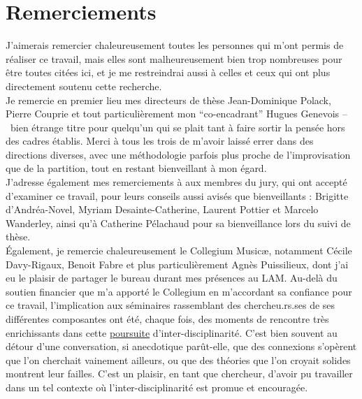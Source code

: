 %
\chapter*{Remerciements}
\label{sec:acknowledgement}
\vspace*{-10mm}


J'aimerais remercier chaleureusement toutes les personnes qui m'ont permis de réaliser ce travail, mais elles sont malheureusement bien trop nombreuses pour être toutes citées ici, et je me restreindrai aussi à celles et ceux qui ont plus directement soutenu cette recherche.\\
\indent Je remercie en premier lieu mes directeurs de thèse Jean-Dominique Polack, Pierre Couprie et tout particulièrement mon ``co-encadrant'' Hugues Genevois --~bien étrange titre pour quelqu'un qui se plait tant à faire sortir la pensée hors des cadres établis. Merci à tous les trois de m'avoir laissé errer dans des directions diverses, avec une méthodologie parfois plus proche de l'improvisation que de la partition, tout en restant bienveillant à mon égard.\\
\noindent J'adresse également mes remerciements à aux membres du jury, qui ont accepté d'examiner ce travail, pour leurs conseils aussi avisés que bienveillants : Brigitte d'Andréa-Novel, Myriam Desainte-Catherine, Laurent Pottier et Marcelo Wanderley, ainsi qu'à Catherine Pélachaud pour sa bienveillance lors du suivi de thèse.\\
\indent Également, je remercie chaleureusement le Collegium Musicæ, notamment Cécile Davy-Rigaux, Benoit Fabre et plus particulièrement Agnès Puissilieux, dont j'ai eu le plaisir de partager le bureau durant mes présences au LAM. Au-delà du soutien financier que m'a apporté le Collegium en m'accordant sa confiance pour ce travail, l'implication aux séminaires rassemblant des chercheu.rs.ses de ses différentes composantes ont été, chaque fois, des moments de rencontre très enrichissants dans cette \ul{poursuite} d'inter-disciplinarité. C'est bien souvent au détour d'une conversation, si anecdotique parût-elle, que des connexions s'opèrent que l'on cherchait vainement ailleurs, ou que des théories que l'on croyait solides montrent leur failles. C'est un plaisir, en tant que chercheur, d'avoir pu travailler dans un tel contexte où l'inter-disciplinarité est promue et encouragée.\\
